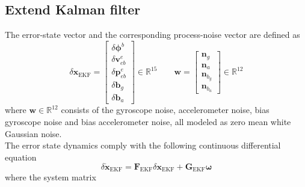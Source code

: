 \documentclass[conference]{IEEEtran}
\begin{document}
\subsection{Extend Kalman filter}
The error-state vector and the corresponding process-noise vector are defined as \cite{10.5555/1594745,groves2013principles}
\begin{equation}
  \label{ekf_state}
\delta \mathbf{x}_{\text{EKF}}
=
\begin{bmatrix}
\delta\boldsymbol{\phi}^b\\
\delta\boldsymbol{v}_{eb}^e\\
\delta\boldsymbol{p}_{eb}^e\\
\delta\boldsymbol{b}_g\\
\delta\boldsymbol{b}_a
\end{bmatrix}
\in\mathbb{R}^{15}
\qquad
\mathbf w
=
\begin{bmatrix}
\boldsymbol n_g\\
\boldsymbol n_a\\
\boldsymbol n_{b_g}\\
\boldsymbol n_{b_a}
\end{bmatrix}
\in\mathbb{R}^{12}
\end{equation}
where \(\boldsymbol w\in \mathbb{R}^{12}\) consists of the gyroscope noise, accelerometer noise, bias gyroscope noise and bias accelerometer noise, all modeled as zero mean white Gaussian noise. \\ 
The error state dynamics comply with the following continuous differential equation
\begin{equation}
  \delta \boldsymbol{\dot{x}}_{\text{EKF}} = \mathbf{F}_{\text{EKF}} \delta \boldsymbol{x}_{\text{EKF}} + \mathbf{G}_{\text{EKF}} \boldsymbol{\omega} 
\end{equation}
where the system matrix
\end{document}
